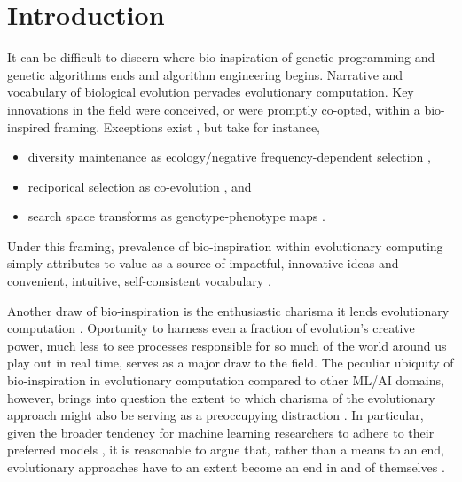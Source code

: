 \section{Introduction} \label{sec:introduction}

It can be difficult to discern where bio-inspiration of genetic programming and genetic algorithms ends and algorithm engineering begins.
Narrative and vocabulary of biological evolution pervades evolutionary computation.
Key innovations in the field were conceived, or were promptly co-opted, within a bio-inspired framing.
Exceptions exist \citep{TODO}, but take for instance,
\begin{itemize}
  \item diversity maintenance as ecology/negative frequency-dependent selection \citep{TODO},
  \item reciporical selection as co-evolution \citep{TODO}, and
  \item search space transforms as genotype-phenotype maps \citep{TODO}.
\end{itemize}
Under this framing, prevalence of bio-inspiration within evolutionary computing simply attributes to value as a source of impactful, innovative ideas and convenient, intuitive, self-consistent vocabulary \citep{sorensen2015metaheuristics,banzhaf2006artificial}.


Another draw of bio-inspiration is the enthusiastic charisma it lends evolutionary computation \citep{lehman2020surprising}.
Oportunity to harness even a fraction of evolution's creative power, much less to see processes responsible for so much of the world around us play out in real time, serves as a major draw to the field.
The peculiar ubiquity of bio-inspiration in evolutionary computation compared to other ML/AI domains, however, brings into question the extent to which charisma of the evolutionary approach might also be serving as a preoccupying distraction \citep{moore2023evolution,sorensen2015metaheuristics}.
In particular, given the broader tendency for machine learning researchers to adhere to their preferred models \citep{domingos2012few}, it is reasonable to argue that, rather than a means to an end, evolutionary approaches have to an extent become an end in and of themselves \citep{woodward2016gp,yampolskiy2018we}.


